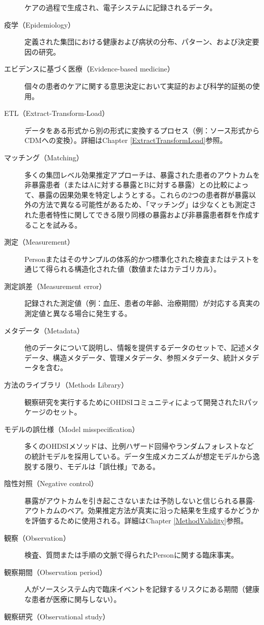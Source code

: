 \documentclass[
  11pt]{book}
\theoremstyle{definition}
\theoremstyle{definition}
\theoremstyle{definition}
\theoremstyle{definition}
\theoremstyle{remark}
\begin{document}
\begin{description}
ケアの過程で生成され、電子システムに記録されるデータ。
\item[疫学（Epidemiology）]
定義された集団における健康および病状の分布、パターン、および決定要因の研究。
\item[エビデンスに基づく医療（Evidence-based medicine）]
個々の患者のケアに関する意思決定において実証的および科学的証拠の使用。
\item[ETL（Extract-Transform-Load）]
データをある形式から別の形式に変換するプロセス（例：ソース形式からCDMへの変換）。詳細はChapter \ref{ExtractTransformLoad}参照。
\item[マッチング（Matching）]
多くの集団レベル効果推定アプローチは、暴露された患者のアウトカムを非暴露患者（またはAに対する暴露とBに対する暴露）との比較によって、暴露の因果効果を特定しようとする。これらの2つの患者群が暴露以外の方法で異なる可能性があるため、「マッチング」は少なくとも測定された患者特性に関してできる限り同様の暴露および非暴露患者群を作成することを試みる。
\item[測定（Measurement）]
Personまたはそのサンプルの体系的かつ標準化された検査またはテストを通じて得られる構造化された値（数値またはカテゴリカル）。
\item[測定誤差（Measurement error）]
記録された測定値（例：血圧、患者の年齢、治療期間）が対応する真実の測定値と異なる場合に発生する。
\item[メタデータ（Metadata）]
他のデータについて説明し、情報を提供するデータのセットで、記述メタデータ、構造メタデータ、管理メタデータ、参照メタデータ、統計メタデータを含む。
\item[方法のライブラリ（Methods Library）]
観察研究を実行するためにOHDSIコミュニティによって開発されたRパッケージのセット。
\item[モデルの誤仕様（Model misspecification）]
多くのOHDSIメソッドは、比例ハザード回帰やランダムフォレストなどの統計モデルを採用している。データ生成メカニズムが想定モデルから逸脱する限り、モデルは「誤仕様」である。
\item[陰性対照（Negative control）]
暴露がアウトカムを引き起こさないまたは予防しないと信じられる暴露-アウトカムのペア。効果推定方法が真実に沿った結果を生成するかどうかを評価するために使用される。詳細はChapter \ref{MethodValidity}参照。
\item[観察（Observation）]
検査、質問または手順の文脈で得られたPersonに関する臨床事実。
\item[観察期間（Observation period）]
人がソースシステム内で臨床イベントを記録するリスクにある期間（健康な患者が医療に関与しない）。
\item[観察研究（Observational study）]

\end{description}
\end{document}
